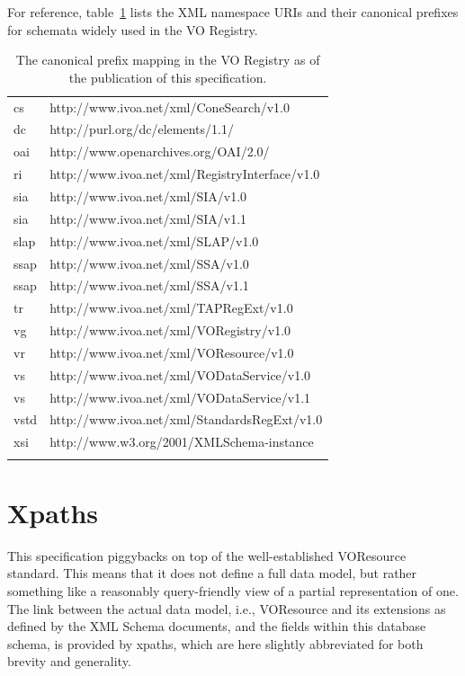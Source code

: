 \documentclass[11pt,a4paper]{ivoa}
\begin{document}
For reference, table~\ref{tab:prefixmap}
lists the XML namespace URIs and their canonical prefixes
for schemata widely used in the VO Registry.

\begin{table}
\begin{tabular}{ll}
\sptablerule
cs&http://www.ivoa.net/xml/ConeSearch/v1.0\\
dc&http://purl.org/dc/elements/1.1/\\
oai&http://www.openarchives.org/OAI/2.0/\\
ri&http://www.ivoa.net/xml/RegistryInterface/v1.0\\
sia&http://www.ivoa.net/xml/SIA/v1.0\\
sia&http://www.ivoa.net/xml/SIA/v1.1\\
slap&http://www.ivoa.net/xml/SLAP/v1.0\\
ssap&http://www.ivoa.net/xml/SSA/v1.0\\
ssap&http://www.ivoa.net/xml/SSA/v1.1\\
tr&http://www.ivoa.net/xml/TAPRegExt/v1.0\\
vg&http://www.ivoa.net/xml/VORegistry/v1.0\\
vr&http://www.ivoa.net/xml/VOResource/v1.0\\
vs&http://www.ivoa.net/xml/VODataService/v1.0\\
vs&http://www.ivoa.net/xml/VODataService/v1.1\\
vstd&http://www.ivoa.net/xml/StandardsRegExt/v1.0\\
xsi&http://www.w3.org/2001/XMLSchema-instance\\
\sptablerule
\end{tabular}
\caption{The canonical prefix mapping in the VO Registry as of the
publication of this specification.}
\label{tab:prefixmap}
\end{table}


\section{Xpaths}

\label{vorutypes}

This specification piggybacks on top of the well-established
VOResource standard.  This means that it does not define a full data model,
but rather something like a reasonably query-friendly view of a partial
representation of one.  The link between the actual data model, i.e.,
VOResource and its extensions as defined by the XML Schema documents, and
the fields within this database schema, is provided by
xpaths, which are here slightly abbreviated for both brevity and
generality.
\end{document}
